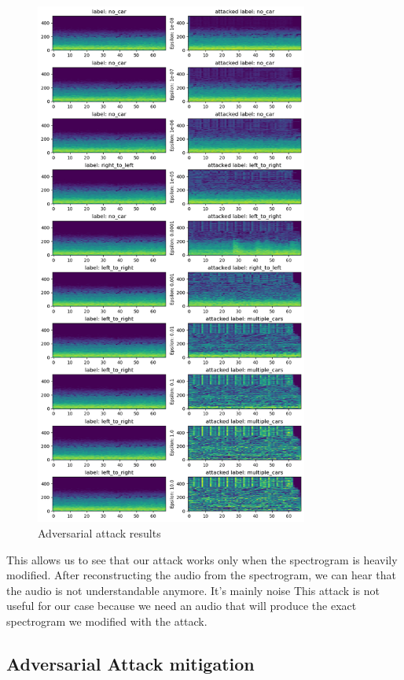 \begin{figure}[H]
    \centering
    \includegraphics[width=0.8\textwidth]{images/adversarial_attack_results.png}
    \caption{Adversarial attack results}
    \label{fig:adversarial_attack_results}
\end{figure}

This allows us to see that our attack works only when the spectrogram is heavily modified. After reconstructing the audio from the spectrogram, we can hear that the audio is not understandable anymore. It's mainly noise This attack is not useful for our case because we need an audio that will produce the exact spectrogram we modified with the attack.

\subsection{Adversarial Attack mitigation}


